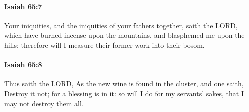 		\paragraph{Isaiah 65:7} %
			\label{ISAIAH-65-7}

			Your iniquities, and the iniquities of your fathers together, saith the LORD, which have burned incense upon the mountains, and blasphemed me upon the hills: therefore will I measure their former work into their bosom.


		\paragraph{Isaiah 65:8} %
			\label{ISAIAH-65-8}

			Thus saith the LORD, As the new wine is found in the cluster, and one saith, Destroy it not; for a blessing is in it: so will I do for my servants' sakes, that I may not destroy them all.

